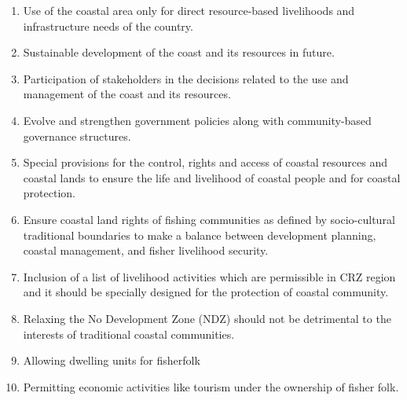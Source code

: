 \begin{multicols}{2}
\begin{enumerate}
\item Use of the coastal area only for direct resource-based livelihoods and infrastructure
needs of the country.

\item Sustainable development of the coast and its resources in future.

\item Participation of stakeholders in the decisions related to the use and management of the
coast and its resources.

\item Evolve and strengthen government policies along with community-based governance
structures.

\item Special provisions for the control, rights and access of coastal resources and coastal
lands to ensure the life and livelihood of coastal people and for coastal protection.

\item Ensure coastal land rights of fishing communities as defined by socio-cultural
traditional boundaries to make a balance between development planning, coastal
management, and fisher livelihood security.

\item Inclusion of a list of livelihood activities which are permissible in CRZ region and it
should be specially designed for the protection of coastal community.

\item Relaxing the No Development Zone (NDZ) should not be detrimental to the interests
of traditional coastal communities.

\item Allowing dwelling units for fisherfolk

\item Permitting economic activities like tourism under the ownership of fisher folk.
\end{enumerate}


\end{multicols}
